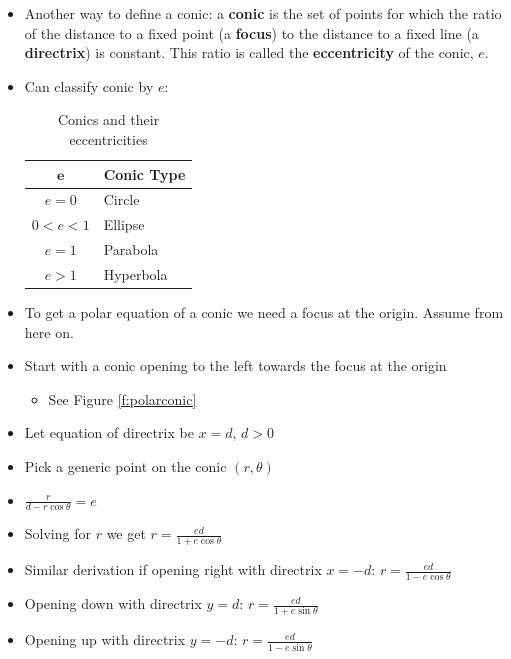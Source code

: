 \documentclass[letterpaper, 11pt, openany]{book}
\theoremstyle{mytheoremstyle}
\theoremstyle{myexamplestyle}
\begin{document}
\begin{itemize}
    \item Another way to define a conic: a \textbf{conic} is the set of points for which the ratio of the distance to a fixed point (a \textbf{focus}) to the distance to a fixed line (a \textbf{directrix}) is constant. This ratio is called the \textbf{eccentricity} of the conic, $e$.
    \item Can classify conic by $e$:
    \begin{table}[htbp]
	\centering
	\caption{Conics and their eccentricities}
	\begin{tabular}{cl}
		$\bm{e}$    & \textbf{Conic Type} \\ \hline
		$e = 0$     & Circle \\
		$0 < e < 1$ & Ellipse \\
        $e = 1$     & Parabola \\
		$e > 1$     & Hyperbola \\ \hline
	\end{tabular}
\end{table}
    \item To get a polar equation of a conic we need a focus at the origin. Assume from here on.
    \item Start with a conic opening to the left towards the focus at the origin
    \begin{itemize}
        \item See Figure \ref{f:polarconic}
    \end{itemize}
    \item Let equation of directrix be $x = d$, $d > 0$
    \item Pick a generic point on the conic $(r, \theta)$
    \item $\displaystyle \frac{r}{d - r \cos \theta} = e$
    \item Solving for $r$ we get $\displaystyle r = \frac{ed}{1 + e\cos \theta}$
    \item Similar derivation if opening right with directrix $x = -d$: $\displaystyle r = \frac{ed}{1 - e\cos \theta}$
    \item Opening down with directrix $y = d$: $\displaystyle r = \frac{ed}{1 + e\sin \theta}$
    \item Opening up with directrix $y = -d$: $\displaystyle r = \frac{ed}{1 - e\sin \theta}$
\end{itemize}
\end{document}
